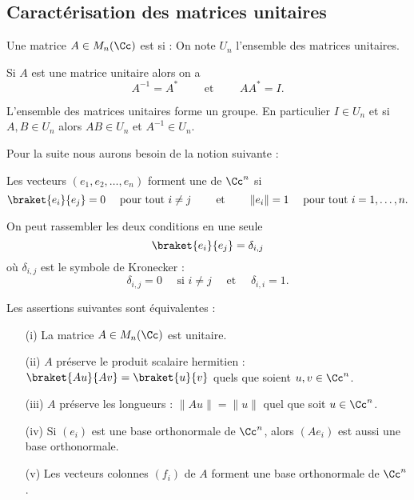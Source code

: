 \documentclass[11pt,class=report,crop=false]{standalone}
\begin{document}
\subsection{Caractérisation des matrices unitaires}



\begin{definition}
Une matrice $A \in M_n(\Cc)$ est  si :
On note $U_n$ l'ensemble des matrices unitaires.
\end{definition}

Si $A$ est une matrice unitaire alors on a 
$$A^{-1} = A^* \qquad \text{ et  }\qquad A A^* = I.$$

\begin{proposition}
L'ensemble des matrices unitaires forme un groupe.
En particulier $I \in U_n$ et si $A, B \in U_n$ alors $AB \in U_n$ et $A^{-1} \in U_n$.
\end{proposition}


Pour la suite nous aurons besoin de la notion suivante :
\begin{definition}
Les vecteurs $(e_1,e_2,\ldots,e_n)$ forment une  de $\Cc^n$
si 
$$\braket{e_i}{e_j} = 0  \quad \text{ pour tout } i\neq j
\qquad\text{ et }\qquad\|e_i\|=1 \quad \text{ pour tout } i=1,\ldots,n.$$
\end{definition}


On peut rassembler les deux conditions en une seule
$$\braket{e_i}{e_j} = \delta_{i,j}$$
où $\delta_{i,j}$ est le symbole de Kronecker :
$$\delta_{i,j} = 0 \quad \text{ si } i\neq j \quad \text{ et } \quad \delta_{i,i} = 1.$$



\begin{proposition}
\label{prop:equnitaire}
Les assertions suivantes sont équivalentes :
\begin{itemize}
  \item [(i)] La matrice $A \in M_n(\Cc)$ est unitaire.
  \item [(ii)] $A$ préserve le produit scalaire hermitien : $\braket{Au}{Av} = \braket{u}{v}$ quels que soient $u,v \in \Cc^n$.
  \item [(iii)] $A$ préserve les longueurs : $\|Au\| = \|u\|$ quel que soit $u \in \Cc^n$.
  \item [(iv)] Si $(e_i)$ est une base orthonormale de $\Cc^n$, alors $(Ae_i)$ est aussi une base orthonormale.
  \item [(v)] Les vecteurs colonnes $(f_i)$ de $A$ forment une base orthonormale de $\Cc^n$.
\end{itemize}
\end{proposition}
\end{document}
